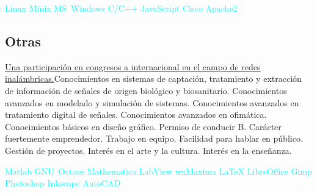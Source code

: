 \documentclass[11pt,a4paper,sans,spanish]{moderncv}
\begin{document}
\begin{center}
\textcolor{cyan}{
Linux \quad{} Minix \quad{} MS~Windows \quad{} C/C++ \quad{} JavaScript \quad{} Cisco \quad{} Apache2 
}
\end{center}

\subsection{Otras}
\href{http://ieeexplore.ieee.org/stamp/stamp.jsp?tp=&arnumber=7733012&isnumber=7732953}{Una participación en congresos a internacional en el campo de redes inalámbricas.}\quad Conocimientos en sistemas de captación, tratamiento y extracción de información de señales de origen biológico y biosanitario.\quad
Conocimientos avanzados en modelado y simulación de sistemas.\quad
Conocimientos avanzados en tratamiento digital de señales.\quad
Conocimientos avanzados en ofimática.\quad
Conocimientos básicos en diseño gráfico.\quad
Permiso de conducir B. \quad{} Carácter fuertemente emprendedor. \quad{} Trabajo en equipo. \quad{} Facilidad para hablar en público. \quad{} Gestión de proyectos. \quad{} Interés en el arte y la cultura. \quad{} Interés en la enseñanza.

\begin{center}
\textcolor{cyan}{
Matlab \quad{} GNU~Octave \quad{} Mathematica \quad{} LabView \quad{} wxMaxima \quad{} LaTeX \quad{} LibreOffice \quad{} Gimp \quad{} Photoshop \quad{} Inkscape \quad{} AutoCAD
}
\end{center}
\end{document}
